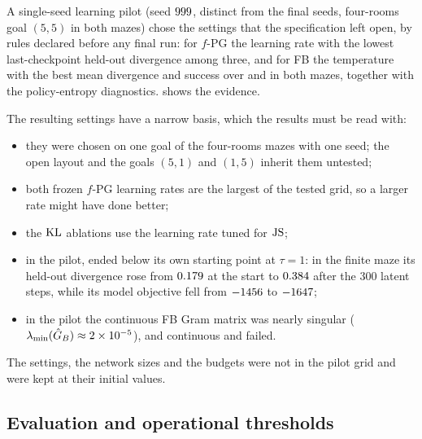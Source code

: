 A single-seed learning pilot (seed $\vn{pilot.seed}{999}$, distinct from the final seeds, four-rooms goal $(5,5)$ in both mazes) chose the settings that the specification left open, by rules declared before any final run: for $f$-PG the learning rate with the lowest last-checkpoint held-out divergence among three, and for FB the temperature with the best mean divergence and success over \ERFB{} and \DMFB{} in both mazes, together with the policy-entropy diagnostics.  shows the evidence.

\begin{table}[ht]
\centering\small
\caption{Learning pilot (seed , four rooms, goal $(5,5)$): held-out divergence (nats) and success at the last checkpoint. Used only to choose the frozen settings; these are not results.}\label{tab:pilot}

\end{table}

The resulting settings have a narrow basis, which the results must be read with:
\begin{itemize}[nosep]
\item they were chosen on one goal of the four-rooms mazes with one seed; the open layout and the goals $(5,1)$ and $(1,5)$ inherit them untested;
\item both frozen $f$-PG learning rates are the largest of the tested grid, so a larger rate might have done better;
\item the $\KL$ ablations use the learning rate tuned for $\JS$;
\item in the pilot, \DMFB{} ended below its own \ERFB{} starting point at $\tau=1$: in the finite maze its held-out divergence rose from $\vn{s10.pilot.er_start}{0.179}$ at the \ERFB{} start to $\vn{s10.pilot.dm_end}{0.384}$ after the 300 latent steps, while its model objective fell from $\vn{s10.pilot.l0}{-1456}$ to $\vn{s10.pilot.l1}{-1647}$;
\item in the pilot the continuous FB Gram matrix was nearly singular ($\lambda_{\min}(\hat G_B)\approx\vn{s10.pilot.lmin}{2\times10^{-5}}$), and continuous \ERFB{} and \DMFB{} failed.
\end{itemize}
The \DMFB{} settings, the network sizes and the budgets were not in the pilot grid and were kept at their initial values.

\subsection{Evaluation and operational thresholds}

